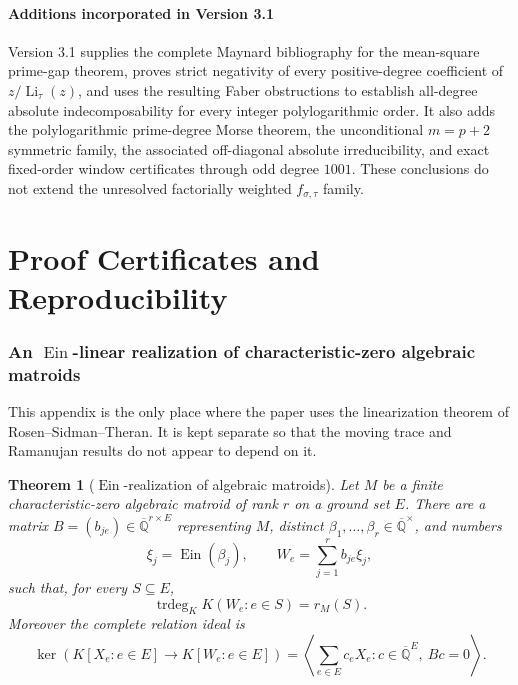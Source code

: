 \documentclass[11pt]{article}
\theoremstyle{keio}
\newtheorem{theorem}{Theorem}[section]
\theoremstyle{definition}
\theoremstyle{remark}
\newcommand{\Qbar}{\overline{\mathbb Q}}
\newcommand{\Ein}{\operatorname{Ein}}
\newcommand{\trdeg}{\operatorname{trdeg}}
\begin{document}
\subsection{Additions incorporated in Version 3.1}

Version 3.1 supplies the complete Maynard bibliography for the mean-square
prime-gap theorem, proves strict negativity of every positive-degree
coefficient of \(z/\operatorname{Li}_\tau(z)\), and uses the resulting Faber
obstructions to establish all-degree absolute indecomposability for every
integer polylogarithmic order.  It also adds the polylogarithmic prime-degree
Morse theorem, the unconditional \(m=p+2\) symmetric family, the associated
off-diagonal absolute irreducibility, and exact fixed-order window
certificates through odd degree \(1001\).  These conclusions do not extend
the unresolved factorially weighted \(f_{\sigma,\tau}\) family.

\clearpage
\appendix
\part{Proof Certificates and Reproducibility}
\section{An \texorpdfstring{\(\Ein\)}{Ein}-linear realization of
characteristic-zero algebraic matroids}
\label{app:Ein-matroids}

This appendix is the only place where the paper uses the linearization
theorem of Rosen--Sidman--Theran.  It is kept separate so that the moving
trace and Ramanujan results do not appear to depend on it.

\begin{theorem}[\(\Ein\)-realization of algebraic matroids]
\label{thm:matroid-Ein-realization}
Let \(M\) be a finite characteristic-zero algebraic matroid of rank \(r\)
on a ground set \(E\).  There are a matrix
\(B=(b_{je})\in\Qbar^{r\times E}\) representing \(M\), distinct
\(\beta_1,\ldots,\beta_r\in\Qbar^\times\), and numbers
\begin{equation}\label{eq:matroid-Ein-realization}
 \xi_j=\Ein(\beta_j),\qquad
 W_e=\sum_{j=1}^r b_{je}\xi_j,
\end{equation}
such that, for every \(S\subseteq E\),
\begin{equation}\label{eq:matroid-rank-realization}
 \boxed{\displaystyle
 \trdeg_KK(W_e:e\in S)=r_M(S).}
\end{equation}
Moreover the complete relation ideal is
\begin{equation}\label{eq:matroid-linear-ideal}
 \boxed{\displaystyle
 \ker\!\left(K[X_e:e\in E]\longrightarrow K[W_e:e\in E]\right)
 =\left\langle\sum_{e\in E}c_eX_e:
 c\in\Qbar^E,\ Bc=0\right\rangle.}
\end{equation}
\end{theorem}
\end{document}
